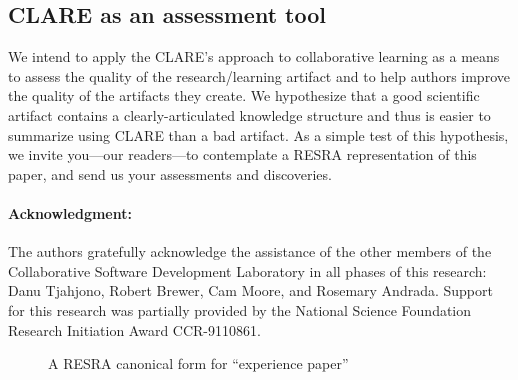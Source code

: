 \subsection{CLARE as an assessment tool}

We intend to apply the CLARE's approach to collaborative learning as a
means to assess the quality of the research/learning artifact and to help
authors improve the quality of the artifacts they create. We hypothesize
that a good scientific artifact contains a clearly-articulated knowledge
structure and thus is easier to summarize using CLARE than a bad artifact.
As a simple test of this hypothesis, we invite you---our readers---to
contemplate a RESRA representation of this paper, and send us your
assessments and discoveries.


\paragraph{Acknowledgment:}
\small
\noindent The authors gratefully acknowledge the assistance of the other
members of the Collaborative Software Development Laboratory in all phases
of this research: Danu Tjahjono, Robert Brewer, Cam Moore, and Rosemary
Andrada.  Support for this research was partially provided by the National
Science Foundation Research Initiation Award CCR-9110861.  \normalsize

\newpage
{}




\pagestyle{empty}

\newpage
\begin{figure}[h]
 \centerline{}
  \caption{A RESRA canonical form for ``experience paper''} 
  \label{fig:experience-crf}
\end{figure}

